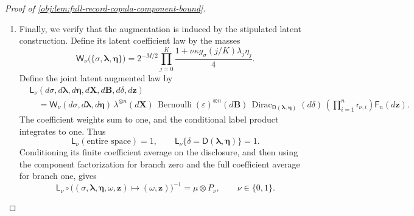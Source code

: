 \documentclass[11pt]{article}
\begin{document}
\begin{proof}[Proof of \cref{obj:lem:full-record-copula-component-bound}]
\begin{enumerate}
For any measurable augmented event
\(\mathsf E_{\mathrm{aug}}\subseteq
 \mathsf\Omega_{\mathrm{aug}}\times\mathsf Z_n\),
define its label section by
\[
\mathsf E_{\mathrm{aug},\omega}
 =\{\mathbf z:(\omega,\mathbf z)\in\mathsf E_{\mathrm{aug}}\}.
\]
The common augmentation marginal implies
\[
\begin{aligned}
&|(\mu\otimes P_0)(\mathsf E_{\mathrm{aug}})
  -(\mu\otimes P_1)(\mathsf E_{\mathrm{aug}})|\\
&\qquad\le
 \int
 |P_0(\omega)(\mathsf E_{\mathrm{aug},\omega})
  -P_1(\omega)(\mathsf E_{\mathrm{aug},\omega})|\,\mu(d\omega)\\
&\qquad\le
 \frac1{16}
 +256\left(\int\mathcal A\,d\mu+\int\mathcal B\,d\mu\right)
 \le\frac1{16}+256\cdot2^{-16}
 =\frac{17}{256}.
\end{aligned}
\]
Taking the supremum over augmented events proves
\[
\operatorname{TV}(\mu\otimes P_0,\mu\otimes P_1)
 \le\frac{17}{256}.
\]

For every measurable original-record event
\(\mathsf E_{\mathrm{rec}}\), its inverse image under \(\mathsf O_L\) is an augmented event. The projection identities from \cref{proof:full-record-copula-component-bound:record-projections} therefore give
\[
\operatorname{TV}(\mathbb P_0,\mathbb P_1)
 \le
 \operatorname{TV}(\mu\otimes P_0,\mu\otimes P_1)
 \le\frac{17}{256}<\frac18.
\]

\item
Finally, we verify that the augmentation is induced by the stipulated latent construction. Define its latent coefficient law by the masses
\[
\mathsf W_\nu
 \bigl(\{\sigma,\boldsymbol\lambda,\boldsymbol\eta\}\bigr)
 =
 2^{-M/2}
 \prod_{j=0}^{K}
 \frac{1+\nu\kappa g_\sigma(j/K)\lambda_j\eta_j}{4}.
\]
Define the joint latent augmented law by
\[
\begin{aligned}
&\mathsf L_\nu
 (d\sigma,d\boldsymbol\lambda,d\boldsymbol\eta,
  d\mathbf X,d\mathbf B,d\delta,d\mathbf z)\\
&\quad=
 \mathsf W_\nu(d\sigma,d\boldsymbol\lambda,d\boldsymbol\eta)\,
 \lambda^{\otimes n}(d\mathbf X)\,
 \operatorname{Bernoulli}(\varepsilon)^{\otimes n}(d\mathbf B)\,
 \operatorname{Dirac}_{\mathsf D(\boldsymbol\lambda,\boldsymbol\eta)}
       (d\delta)\,
 \left(\prod_{i=1}^{n}\mathsf r_{\nu,i}\right)
 \mathsf F_n(d\mathbf z).
\end{aligned}
\]
The coefficient weights sum to one, and the conditional label product integrates to one. Thus
\[
\mathsf L_\nu(\text{entire space})=1,
\qquad
\mathsf L_\nu\{\delta=\mathsf D(\boldsymbol\lambda,\boldsymbol\eta)\}=1.
\]
Conditioning its finite coefficient average on the disclosure, and then using the component factorization for branch zero and the full coefficient average for branch one, gives
\[
\mathsf L_\nu\circ
 \bigl((\sigma,\boldsymbol\lambda,\boldsymbol\eta,\omega,\mathbf z)
       \mapsto(\omega,\mathbf z)\bigr)^{-1}
 =\mu\otimes P_\nu,
\qquad \nu\in\{0,1\}.
\]


\end{enumerate}
\end{proof}
\end{document}
